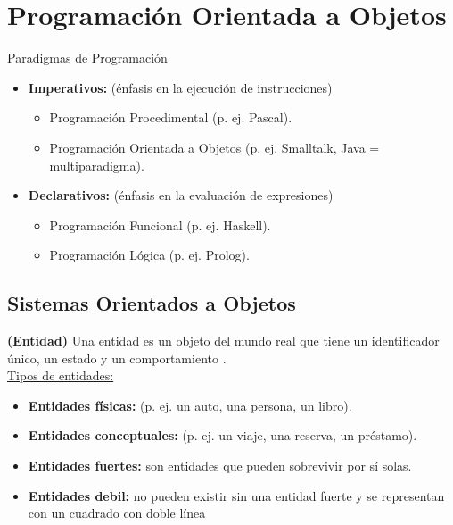 \documentclass[../main.tex]{subfiles}
\begin{document}
\section{Programación Orientada a Objetos} 
    \begin{definition} Paradigmas de Programación
        \begin{itemize}
            \item \textbf{Imperativos:} (énfasis en la ejecución de instrucciones)
                \begin{itemize}
                    \item Programación Procedimental (p. ej. Pascal).
                    \item Programación Orientada a Objetos (p. ej. Smalltalk, Java = multiparadigma).
                \end{itemize}
            \item \textbf{Declarativos:} (énfasis en la evaluación de expresiones)
                \begin{itemize}
                    \item Programación Funcional (p. ej. Haskell).
                    \item Programación Lógica (p. ej. Prolog).
                \end{itemize}
        \end{itemize}
    \end{definition}

    \subsection{Sistemas Orientados a Objetos}
        \begin{definition} \textbf{(Entidad)} 
            Una entidad es un objeto del mundo real que tiene un identificador único, un estado y un comportamiento \cite{def_entidad}.\\
            
            \underline{Tipos de entidades:}
            \begin{itemize}
                \item \textbf{Entidades físicas:} (p. ej. un auto, una persona, un libro).
                \item \textbf{Entidades conceptuales:} (p. ej. un viaje, una reserva, un préstamo).
                \item \textbf{Entidades fuertes:} son entidades que pueden sobrevivir por sí solas. 
                \item \textbf{Entidades debil:} no pueden existir sin una entidad fuerte y se representan con un cuadrado con doble línea
            \end{itemize}
        \end{definition}
\end{document}
